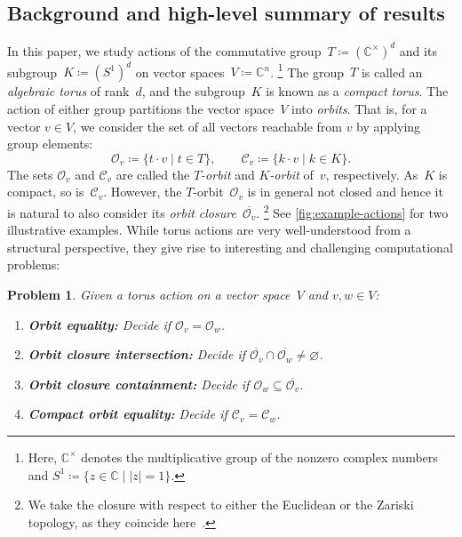\documentclass[a4paper,USenglish,cleveref,numberwithinsect]{lipics-v2021}
\newtheorem{problem}[theorem]{Problem}\crefname{problem}{Problem}{Problems}
\newcommand{\CC}{\mathbb{C}}
\newcommand{\OO}{\ensuremath{\mathcal{O}}}
\newcommand{\KK}{\ensuremath{\mathcal{C}}}
\numberwithin{equation}{section}
\begin{document}
\subsection{Background and high-level summary of results}\label{subsec:orbit problems}
In this paper, we study actions of the commutative group~$T\coloneqq(\CC^\times)^d$ and its subgroup~$K\coloneqq(S^1)^d$
on vector spaces~$V \coloneqq \CC^n$.%
\footnote{Here, $\CC^\times$ denotes the multiplicative group of the nonzero complex numbers and $S^1\coloneqq\{ z\in\CC\mid |z|=1 \}$.}
The group~$T$ is called an \emph{algebraic torus} of rank~$d$, and the subgroup~$K$ is known as a \emph{compact torus}.
The action of either group partitions the vector space~$V$ into \emph{orbits}.
That is, for a vector $v\in V$, we consider the set of all vectors reachable from $v$ by applying group elements:
\[
  \OO_v\coloneqq \{t\cdot v\mid t\in T\}, \qquad \KK_v \coloneqq \{ k\cdot v\mid k\in K \} .
\]
The sets $\OO_v$ and $\KK_v$ are called the \textit{$T$-orbit} and \textit{$K$-orbit} of~$v$, respectively.
As~$K$ is compact, so is~$\KK_v$.
However, the $T$-orbit~$\OO_v$ is in general not closed and hence it is natural to also consider its \emph{orbit closure}~$\overline{\OO_v}$.%
\footnote{We take the closure with respect to either the Euclidean or the Zariski topology, as they coincide here~\cite[I\ \S10]{mumford:red}.}
See \cref{fig:example-actions} for two illustrative examples.
%
While torus actions are very well-understood from a structural perspective, they give rise to interesting and challenging computational problems:

\begin{problem}\label{prob:orbitproblems}
  Given a torus action on a vector space~$V$ and $v,w\in V$:
  \begin{enumerate}
    \item\label{it:orbitproblems:eq} \textbf{Orbit equality:} Decide if $\OO_v=\OO_w$.
    \item\label{it:orbitproblems:oci} \textbf{Orbit closure intersection:} Decide if $\overline{\OO_v}\cap\overline{\OO_w}\ne\varnothing$.
    \item\label{it:orbitproblems:occ} \textbf{Orbit closure containment:} Decide if $\OO_w \subseteq \overline{\OO_v}$.
    \item\label{it:orbitproblems:compact eq} \textbf{Compact orbit equality:} Decide if $\KK_v=\KK_w$.
  \end{enumerate}
\end{problem}
\end{document}
